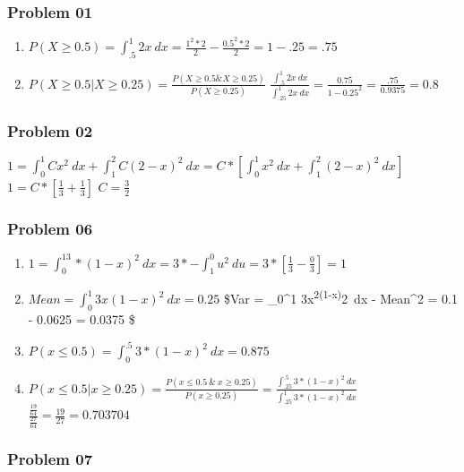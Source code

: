 \documentclass[
]{article}
\providecommand{\tightlist}{%
  \setlength{\itemsep}{0pt}\setlength{\parskip}{0pt}}
\begin{document}
\hypertarget{problem-01}{%
\subsubsection{Problem 01}\label{problem-01}}

\begin{enumerate}
\def\labelenumi{\alph{enumi}.}
\tightlist
\item
  \(P(X \geq0.5)=\int_.5^1 2x\ dx = \frac{1^2 * 2}{2} - \frac{0.5^2 * 2}{2} = 1 - .25 = .75\)
\item
  \(P(X\geq 0.5 | X\geq0.25) = \frac{P(X\geq 0.5 \& X\geq0.25)}{P(X\geq0.25)}\)
  \(\frac{\int_.5^1 2x\ dx}{\int_.25^1 2x\ dx} = \frac{0.75}{1 - 0.25^2} = \frac{.75}{0.9375} = 0.8\)
\end{enumerate}

\hypertarget{problem-02}{%
\subsubsection{Problem 02}\label{problem-02}}

\(1 = \int_0^1 Cx^2\ dx + \int_1^2C(2-x)^2\ dx = C*[\int_0^1x^2\ dx + \int_1^2(2-x)^2\ dx]\)
\(1 = C*[\frac{1}{3} + \frac{1}{3}]\) \(C = \frac{3}{2}\)

\hypertarget{problem-06}{%
\subsubsection{Problem 06}\label{problem-06}}

\begin{enumerate}
\def\labelenumi{\alph{enumi}.}
\tightlist
\item
  \(1 = \int_0^13*(1-x)^2\ dx = 3 * -\int_1^0u^2\ du = 3 * [\frac{1}{3} - \frac{0}{3}] = 1\)
\item
  \(Mean = \int_0^1 3x(1-x)^2\ dx = 0.25\) \$Var = \int\_0\^{}1
  3x\textsuperscript{2(1-x)}2~dx - Mean\^{}2 = 0.1 - 0.0625 = 0.0375 \$
\item
  \(P(x \leq 0.5) = \int_0^.5 3*(1-x)^2\ dx = 0.875\)
\item
  \(P(x\leq 0.5 | x \geq 0.25)= \frac{P(x\leq 0.5\ \&\ x \geq 0.25)}{P(x\geq0.25)} = \frac{\int_.25^.5 3*(1-x)^2\ dx}{\int_.25^1 3*(1-x)^2\ dx}\)
  \(\frac{\frac{19}{64}}{\frac{27}{64}} = \frac{19}{27} = 0.703704\)
\end{enumerate}

\hypertarget{problem-07}{%
\subsubsection{Problem 07}\label{problem-07}}
\end{document}
